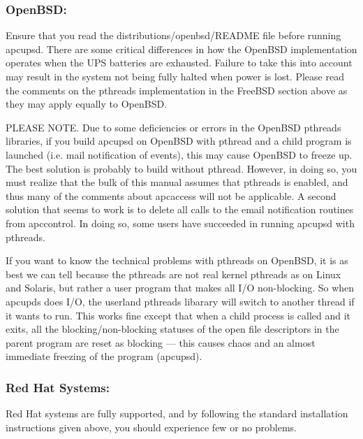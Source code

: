 \label{OpenBSD}

\subsubsection*{OpenBSD:}

\label{index-OpenBSD-42}
\label{index-OS_002c-OpenBSD-43}
Ensure that you read the distributions/openbsd/README file before running
apcupsd. There are some critical differences in how the OpenBSD implementation
operates when the UPS batteries are exhausted. Failure to take this into
account may result in the system not being fully halted when power is lost. 
Please read the comments on the pthreads implementation in the FreeBSD section
above as they may apply equally to OpenBSD.  

PLEASE NOTE. Due to some deficiencies or errors in the OpenBSD pthreads
libraries, if you build apcupsd on OpenBSD with pthread and a child program is
launched (i.e. mail notification of events), this may cause OpenBSD to freeze
up. The best solution is probably to build without pthread. However, in doing
so, you must realize that the bulk of this manual assumes that pthreads is
enabled, and thus many of the comments about apcaccess will not be applicable.
A second solution that seems to work is to delete all calls to the email
notification routines from apccontrol. In doing so, some users have succeeded
in running apcupsd with pthreads.  

If you want to know the technical problems with pthreads on OpenBSD, it is as
best we can tell because the pthreads are not real kernel pthreads as on Linux
and Solaris, but rather a user program that makes all I/O non-blocking. So
when apcupds does I/O, the userland pthreads libarary will switch to another
thread if it wants to run. This works fine except that when a child process is
called and it exits, all the blocking/non-blocking statuses of the open file
descriptors in the parent program are reset as blocking {---} this causes
chaos and an almost immediate freezing of the program (apcupsd). 

\label{Red-Hat-Systems}

\subsubsection*{Red Hat Systems:}

\label{index-Red-Hat-44}
\label{index-OS_002c-Red-Hat-45}
Red Hat systems are fully supported, and by following the standard
installation instructions given above, you should experience few or no
problems. 

